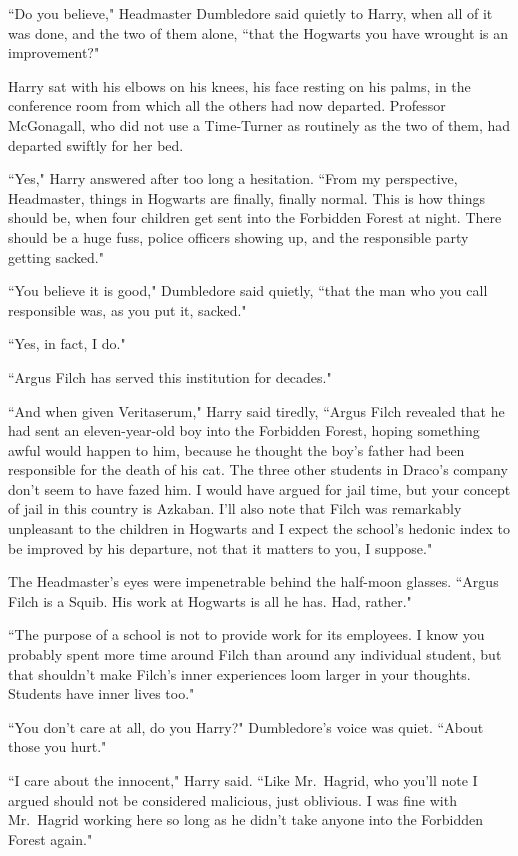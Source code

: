 ``Do you believe," Headmaster Dumbledore said quietly to Harry, when all of it was done, and the two of them alone, ``that the Hogwarts you have wrought is an improvement?"

Harry sat with his elbows on his knees, his face resting on his palms, in the conference room from which all the others had now departed. Professor McGonagall, who did not use a Time-Turner as routinely as the two of them, had departed swiftly for her bed.

``Yes," Harry answered after too long a hesitation. ``From my perspective, Headmaster, things in Hogwarts are finally, finally normal. This is how things should be, when four children get sent into the Forbidden Forest at night. There should be a huge fuss, police officers showing up, and the responsible party getting sacked."

``You believe it is good," Dumbledore said quietly, ``that the man who you call responsible was, as you put it, sacked."

``Yes, in fact, I do."

``Argus Filch has served this institution for decades."

``And when given Veritaserum," Harry said tiredly, ``Argus Filch revealed that he had sent an eleven-year-old boy into the Forbidden Forest, hoping something awful would happen to him, because he thought the boy's father had been responsible for the death of his cat. The three other students in Draco's company don't seem to have fazed him. I would have argued for jail time, but your concept of jail in this country is Azkaban. I'll also note that Filch was remarkably unpleasant to the children in Hogwarts and I expect the school's hedonic index to be improved by his departure, not that it matters to you, I suppose."

The Headmaster's eyes were impenetrable behind the half-moon glasses. ``Argus Filch is a Squib. His work at Hogwarts is all he has. Had, rather."

``The purpose of a school is not to provide work for its employees. I know you probably spent more time around Filch than around any individual student, but that shouldn't make Filch's inner experiences loom larger in your thoughts. Students have inner lives too."

``You don't care at all, do you Harry?" Dumbledore's voice was quiet. ``About those you hurt."

``I care about the innocent," Harry said. ``Like Mr.~Hagrid, who you'll note I argued should not be considered malicious, just oblivious. I was fine with Mr.~Hagrid working here so long as he didn't take anyone into the Forbidden Forest again."

